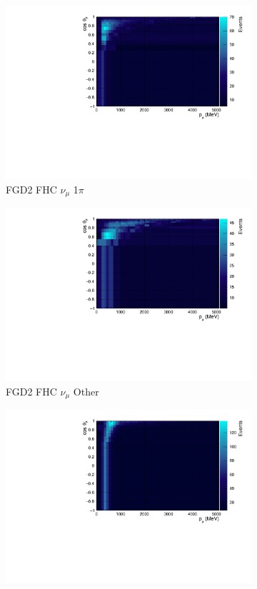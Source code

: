 \begin{figure}[!htbp]
\begin{subfigure}{.32\textwidth}
  \includegraphics[width=0.95\linewidth]{figs/TH2PolyNom_MC_FGD2_numuCC_1pi}
  \caption{FGD2 FHC $\nu_{\mu}$ 1$\pi$}
  \label{fig:th2polynomFGD2_numuCC_1pi}
\end{subfigure}
\begin{subfigure}{.32\textwidth}
  \centering
  \includegraphics[width=0.95\linewidth]{figs/TH2PolyNom_MC_FGD2_numuCC_other}
  \caption{FGD2 FHC $\nu_{\mu}$ Other}
  \label{fig:th2polynomFGD2_numuCC_other}
\end{subfigure}
\centering
\begin{subfigure}{.32\textwidth}
  \centering
  \includegraphics[width=0.95\linewidth]{figs/TH2PolyNom_MC_FGD1_anti-numuCC_0pi}

\end{subfigure}
\end{figure}
